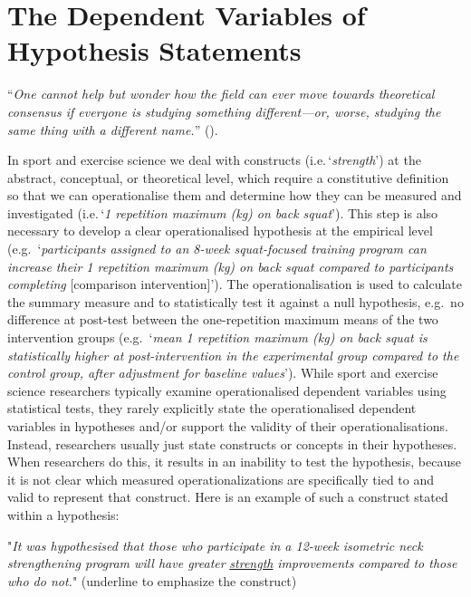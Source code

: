\documentclass[
]{article}
\begin{document}
\section{The Dependent Variables of Hypothesis
Statements}\label{the-dependent-variables-of-hypothesis-statements}

``\emph{One cannot help but wonder how the field can ever move towards
theoretical consensus if everyone is studying something different---or,
worse, studying the same thing with a different name.}''
().

In sport and exercise science we deal with constructs
(i.e.\,`\emph{strength}') at the abstract, conceptual, or theoretical
level, which require a constitutive definition so that we can
operationalise them and determine how they can be measured and
investigated (i.e.\,`\emph{1 repetition maximum (kg) on back squat}').
This step is also necessary to develop a clear operationalised
hypothesis at the empirical level (e.g.~`\emph{participants assigned to
an 8-week squat-focused training program can increase their 1 repetition
maximum (kg) on back squat compared to participants completing}
{[}comparison intervention{]}'). The operationalisation is used to
calculate the summary measure and to statistically test it against a
null hypothesis, e.g.~no difference at post-test between the
one-repetition maximum means of the two intervention groups
(e.g.~`\emph{mean 1 repetition maximum (kg) on back squat is
statistically higher at post-intervention in the experimental group
compared to the control group, after adjustment for baseline values}').
While sport and exercise science researchers typically examine
operationalised dependent variables using statistical tests, they rarely
explicitly state the operationalised dependent variables in hypotheses
and/or support the validity of their operationalisations. Instead,
researchers usually just state constructs or concepts in their
hypotheses. When researchers do this, it results in an inability to test
the hypothesis, because it is not clear which measured
operationalizations are specifically tied to and valid to represent that
construct. Here is an example of such a construct stated within a
hypothesis:

\begin{center}

"\textit{It was hypothesised that those who participate in a 12-week isometric neck strengthening program will have greater} \underline{\textit{strength}} \textit{improvements compared to those who do not.}" (underline to emphasize the construct)

\end{center}
\end{document}
